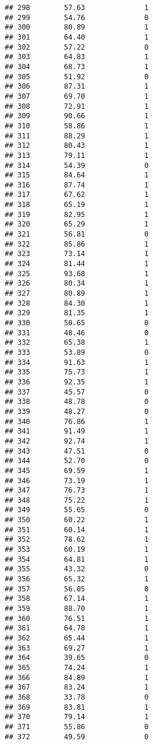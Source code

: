 \documentclass[
]{article}
\begin{document}
\begin{verbatim}
## 298        57.63              1
## 299        54.76              0
## 300        80.89              1
## 301        64.40              1
## 302        57.22              0
## 303        64.83              1
## 304        68.73              1
## 305        51.92              0
## 306        87.31              1
## 307        69.70              1
## 308        72.91              1
## 309        90.66              1
## 310        58.86              1
## 311        88.29              1
## 312        80.43              1
## 313        79.11              1
## 314        54.39              0
## 315        84.64              1
## 316        87.74              1
## 317        67.62              1
## 318        65.19              1
## 319        82.95              1
## 320        65.29              1
## 321        56.81              0
## 322        85.86              1
## 323        73.14              1
## 324        81.44              1
## 325        93.68              1
## 326        80.34              1
## 327        80.89              1
## 328        84.30              1
## 329        81.35              1
## 330        50.65              0
## 331        48.46              0
## 332        65.38              1
## 333        53.89              0
## 334        91.63              1
## 335        75.73              1
## 336        92.35              1
## 337        45.57              0
## 338        48.78              0
## 339        48.27              0
## 340        76.86              1
## 341        91.49              1
## 342        92.74              1
## 343        47.51              0
## 344        52.70              0
## 345        69.59              1
## 346        73.19              1
## 347        76.73              1
## 348        75.22              1
## 349        55.65              0
## 350        60.22              1
## 351        60.14              1
## 352        78.62              1
## 353        60.19              1
## 354        64.81              1
## 355        43.32              0
## 356        65.32              1
## 357        56.05              0
## 358        67.14              1
## 359        88.70              1
## 360        76.51              1
## 361        64.78              1
## 362        65.44              1
## 363        69.27              1
## 364        39.65              0
## 365        74.24              1
## 366        84.89              1
## 367        83.24              1
## 368        33.78              0
## 369        83.81              1
## 370        79.14              1
## 371        55.86              0
## 372        49.59              0

\end{verbatim}
\end{document}

